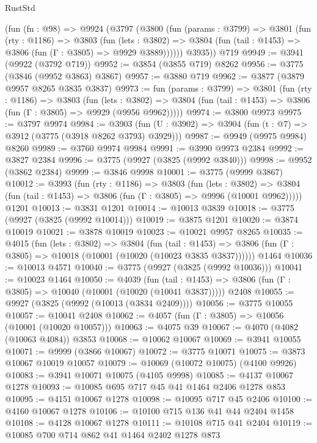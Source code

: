 \begin{lexlean}{RustStd}
\begin{coremodule}
{\begin{coremodule}
{{{{{{{{{{{{{{{{{{{{{{{{{{{{{{{    (fun (fn : @98) =>
    @9924
      (@3797
        (@3800
          (fun (params : @3799) =>
          @3801
            (fun (rty : @1186) =>
            @3803
              (fun (lets : @3802) =>
              @3804 (fun (tail : @1453) => @3806 (fun (Γ : @3805) => @9929 @3889))))))
        @3935))
    @719
@9949 := @3941 (@9922 (@3792 @719))
@9952 := @3854 (@3855 @719) @8262
@9956 := @3775 (@3846 (@9952 @3863) @3867)
@9957 := @3880 @719
@9962 := @3877 (@3879 @9957 @8265 @3835 @3837)
@9973 := fun (params : @3799) =>
  @3801
    (fun (rty : @1186) =>
    @3803
      (fun (lets : @3802) =>
      @3804 (fun (tail : @1453) => @3806 (fun (Γ : @3805) => @9929 (@9956 @9962)))))
@9974 := @3800 @9973
@9975 := @3797 @9974
@9984 := @3903 (fun (U : @3902) => @3904 (fun (t : @7) => @3912 (@3775 (@3918 @8262 @3793) @3929)))
@9987 := @9949 (@9975 @9984) @8260
@9989 := @3760 @9974 @9984
@9991 := @3990 @9973 @2384
@9992 := @3827 @2384
@9996 := @3775 (@9927 (@3825 (@9992 @3840)))
@9998 := @9952 (@3862 @2384)
@9999 := @3846 @9998
@10001 := @3775 (@9999 @3867)
@10012 := @3993
    (fun (rty : @1186) =>
    @3803
      (fun (lets : @3802) =>
      @3804 (fun (tail : @1453) => @3806 (fun (Γ : @3805) => @9996 (@10001 @9962)))))
    @1201
@10013 := @3831 @1201
@10014 := @10013 @3839
@10018 := @3775 (@9927 (@3825 (@9992 @10014)))
@10019 := @3875 @1201
@10020 := @3874 @10019
@10021 := @3878 @10019
@10023 := @10021 @9957 @8265
@10035 := @4015
    (fun (lets : @3802) =>
    @3804
      (fun (tail : @1453) =>
      @3806 (fun (Γ : @3805) => @10018 (@10001 (@10020 (@10023 @3835 @3837))))))
    @1464
@10036 := @10013 @4571
@10040 := @3775 (@9927 (@3825 (@9992 @10036)))
@10041 := @10023 @1464
@10050 := @4039
    (fun (tail : @1453) => @3806 (fun (Γ : @3805) => @10040 (@10001 (@10020 (@10041 @3837)))))
    @2408
@10055 := @9927 (@3825 (@9992 (@10013 (@3834 @2409))))
@10056 := @3775 @10055
@10057 := @10041 @2408
@10062 := @4057 (fun (Γ : @3805) => @10056 (@10001 (@10020 @10057)))
@10063 := @4075 @39
@10067 := @4070 (@4082 (@10063 @4084)) @3853
@10068 := @10062 @10067
@10069 := @3941 @10055
@10071 := @9999 (@3866 @10067)
@10072 := @3775 @10071
@10075 := @3873 @10067 @10019 @10057
@10079 := @10069 (@10072 @10075) (@4100 @9926)
@10083 := @3941 @10071 @10075 (@4105 @9998)
@10085 := @4137 @10067 @1278
@10093 := @10085 @695 @717 @45 @41 @1464 @2406 @1278 @853
@10095 := @4151 @10067 @1278
@10098 := @10095 @717 @45 @2406
@10100 := @4160 @10067 @1278
@10106 := @10100 @715 @136 @41 @44 @2404 @1458
@10108 := @4128 @10067 @1278
@10111 := @10108 @715 @41 @2404
@10119 := @10085 @700 @714 @862 @41 @1464 @2402 @1278 @873
}}}}}}}}}}}}}}}}}}}}}}}}}}}}}}}
\end{coremodule}}
\end{coremodule}
\end{lexlean}
